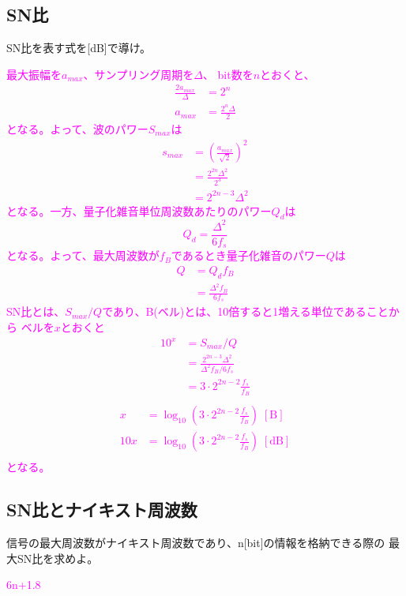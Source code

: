 \documentclass[twocolumn]{ltjsarticle}
\newcommand{\visible}{visible}
\newcommand{\ans}[1]{
\begin{tcolorbox}[\visible]
\textcolor{magenta}{#1}
\end{tcolorbox}
}
\begin{document}
\subsection{SN比}
SN比を表す式を[dB]で導け。
\ans{
    最大振幅を$a_{max}$、サンプリング周期を$\Delta$、
    bit数を$n$とおくと、
    \begin{align*}
        \frac{2a_{max}}{\Delta}&=2^n\\
        a_{max}&=\frac{2^n\Delta}{2}
    \end{align*}
    となる。よって、波のパワー$S_{max}$は
    \begin{align*}
        s_{max}&=\left(\frac{a_{max}}{\sqrt{2}}\right)^2\\
        &=\frac{2^{2n}\Delta^2}{2^3}\\
        &=2^{2n-3}\Delta^2
    \end{align*}
    となる。一方、量子化雑音単位周波数あたりのパワー$Q_d$は
    $$Q_d=\frac{\Delta^2}{6f_s}$$
    となる。よって、最大周波数が$f_B$であるとき量子化雑音のパワー$Q$は
    \begin{align*}
        Q&=Q_df_B\\
        &=\frac{\Delta^2f_B}{6f_s}
    \end{align*}
    SN比とは、$S_{max}/Q$であり、B(ベル)とは、10倍すると1増える単位であることから
    ベルを$x$とおくと
    \begin{align*}
        10^x&=S_{max}/Q\\
        &=\frac{2^{2n-3}\Delta^2}{{\Delta^2f_B}/{6f_s}}\\
        &=3\cdot2^{2n-2}\frac{f_s}{f_B}\\
    \end{align*}
    \begin{align*}
        x&=\log_{10}\left(3\cdot2^{2n-2}\frac{f_s}{f_B}\right) \; [\mathrm{B}]\\
        10x&=\log_{10}\left(3\cdot2^{2n-2}\frac{f_s}{f_B}\right) \; [\mathrm{dB}]\\
    \end{align*}
    となる。
}
\subsection{SN比とナイキスト周波数}
信号の最大周波数がナイキスト周波数であり、n[bit]の情報を格納できる際の
最大SN比を求めよ。
\ans{
    6n+1.8
}

\nocite{*}
\printbibliography
\end{document}
